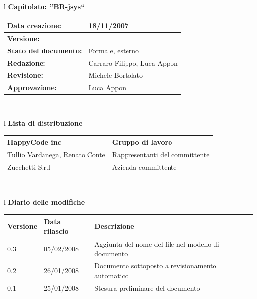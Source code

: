 \documentclass[11pt,titlepage,a4paper]{report}
\begin{document}
\begin{center}
\thispagestyle{plain}
\begin{table}[htbp]
\large{
\begin{tabular}{l}
\Large{\textbf{\textsf{Capitolato: ''BR-jsys``}}} \\
\begin{tabular}{||p{6cm}||p{6cm}||}
\hline
\textbf{Data creazione:} & 18/11/2007 \\ \hline
\textbf{Versione:} & \lv \\ \hline
\textbf{Stato del documento:} & Formale, esterno \\ \hline
\textbf{Redazione:} & Carraro Filippo, Luca Appon \\ \hline
\textbf{Revisione:} & Michele Bortolato   \\ \hline
\textbf{Approvazione:}  & Luca Appon \\ \hline
\end{tabular} \\
\end{tabular}
}
\end{table}

\begin{table}[hbtp]
\large{
\begin{tabular}{l}
\Large{\textbf{\textsf{Lista di distribuzione}}} \\

\begin{tabular}{||p{6cm}||p{6cm}||} \hline
{HappyCode inc}& Gruppo di lavoro\\ \hline
{Tullio Vardanega, Renato Conte}& Rappresentanti del committente \\ \hline
{Zucchetti S.r.l}& Azienda committente\\ \hline
\end{tabular} \\
\end{tabular}
}
\end{table}
\begin{table}[hbtp]
\large{
\begin{tabular}{l}
\Large{\textbf{\textsf{Diario delle modifiche}}} \\
\begin{tabular}{||p{2cm}||p{3.5cm}||p{6cm}||} \hline
\textbf{Versione} & \textbf{Data rilascio} & \textbf{Descrizione} \\ \hline
0.3 & 05/02/2008 & Aggiunta del nome del file nel modello di documento\\ \hline
0.2 & 26/01/2008 & Documento sottoposto a revisionamento automatico\\ \hline
0.1 & 25/01/2008 & Stesura preliminare del documento \\ \hline

\end{tabular} \\
\end{tabular}

}
\end{table}
\end{center}
\newpage
\end{document}
